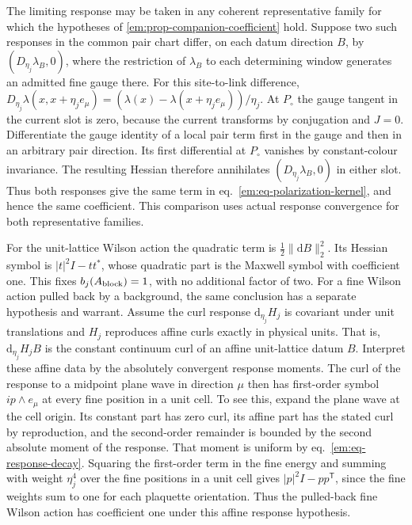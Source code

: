 \documentclass[11pt,letterpaper,reqno]{amsart}
\numberwithin{equation}{section}
\renewcommand{\eqref}[1]{\textup{eq.~\ref{#1}}}
\theoremstyle{definition}
\theoremstyle{remark}
\begin{document}
The limiting response may be taken in any coherent representative
family for which the hypotheses of
\cref{em:prop-companion-coefficient} hold. Suppose two such
responses in the common pair chart differ, on each datum direction
\(B\), by \((D_{\eta_j}\lambda_B,0)\), where the restriction
of \(\lambda_B\) to each determining window generates an admitted
fine gauge there. For this site-to-link difference,
\(D_{\eta_j}\lambda(x,x+\eta_je_\mu)
=(\lambda(x)-\lambda(x+\eta_je_\mu))/\eta_j\). At \(P_\circ\) the
gauge tangent in the current slot is zero, because the current
transforms by conjugation and \(J=0\). Differentiate the gauge
identity of a local pair term first in the gauge and then in an
arbitrary pair direction. Its first differential at \(P_\circ\)
vanishes by constant-colour invariance. The resulting Hessian
therefore annihilates \((D_{\eta_j}\lambda_B,0)\) in either
slot. Thus both responses give the same term in
\eqref{em:eq-polarization-kernel}, and hence the same coefficient.
This comparison uses actual response convergence for both
representative families.

For the unit-lattice Wilson action the quadratic term is
$\tfrac12\|\mathrm d B\|_2^2$. Its Hessian symbol is
$|t|^2 I-tt^*$, whose quadratic part is the Maxwell symbol with
coefficient one. This fixes $b_j(A_{\rm block})=1$, with no additional
factor of two. For a fine Wilson action pulled back by a background,
the same conclusion has a separate hypothesis and warrant.
Assume the curl response $\mathrm d_{\eta_j}H_j$ is covariant under
unit translations and $H_j$ reproduces affine curls exactly in physical units. That is,
$\mathrm d_{\eta_j}H_jB$ is the constant continuum curl of an affine
unit-lattice datum $B$. Interpret these affine data by the absolutely
convergent response moments. The curl of the response to a midpoint
plane wave in direction $\mu$ then has first-order symbol
$i p\wedge e_\mu$ at every fine position in a unit cell. To see this,
expand the plane wave at the cell origin. Its constant part has zero
curl, its affine part has the stated curl by reproduction, and the
second-order remainder is bounded by the second absolute moment of
the response. That moment is uniform by
\eqref{em:eq-response-decay}. Squaring the first-order term in the
fine energy and summing with weight $\eta_j^4$ over the fine
positions in a unit cell gives $|p|^2 I-pp^{\mathsf T}$, since the
fine weights sum to one for each plaquette orientation. Thus
the pulled-back fine Wilson action has coefficient one under this
affine response hypothesis.
\end{document}

